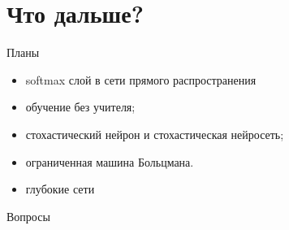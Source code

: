 \documentclass[10pt]{beamer}
\begin{document}
\section{Что дальше?}

\begin{frame}{Планы}

\begin{itemize}
	\item softmax слой в сети прямого распространения
	\item обучение без учителя;
	\item стохастический нейрон и стохастическая нейросеть;
	\item ограниченная машина Больцмана.
	\item глубокие сети
\end{itemize}

\end{frame}


\begin{frame}[plain]
\begin{center}
{\Large Вопросы}
\end{center}
\end{frame}
\end{document}
